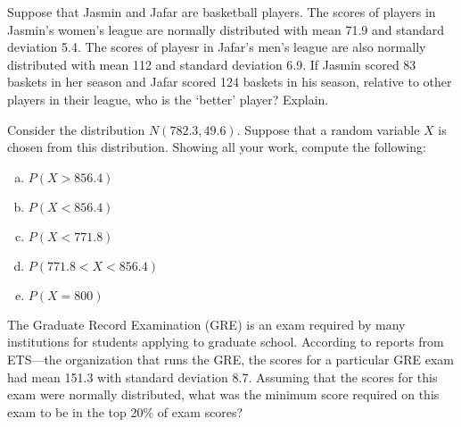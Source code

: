 \documentclass[11pt,letterpaper]{article}
\begin{document}

 Suppose that Jasmin and Jafar are basketball players. The scores of players in Jasmin's women's league are normally distributed with mean 71.9 and standard deviation 5.4. The scores of playesr in Jafar's men's league are also normally distributed with mean 112 and standard deviation 6.9. If Jasmin scored 83 baskets in her season and Jafar scored 124 baskets in his season, relative to other players in their league, who is the `better' player? Explain. 



\newpage



 Consider the distribution $N(782.3,49.6)$. Suppose that a random variable $X$ is chosen from this distribution. Showing all your work, compute the following:
	\begin{enumerate}[(a)]
	\item $P(X > 856.4)$
	\item $P(X < 856.4)$
	\item $P(X < 771.8)$
	\item $P(771.8 < X < 856.4)$
	\item $P(X= 800)$
	\end{enumerate}



\newpage



 The Graduate Record Examination (GRE) is an exam required by many institutions for students applying to graduate school. According to reports from ETS---the organization that runs the GRE, the scores for a particular GRE exam had mean 151.3 with standard deviation 8.7. Assuming that the scores for this exam were normally distributed, what was the minimum score required on this exam to be in the top 20\% of exam scores?
\end{document}
